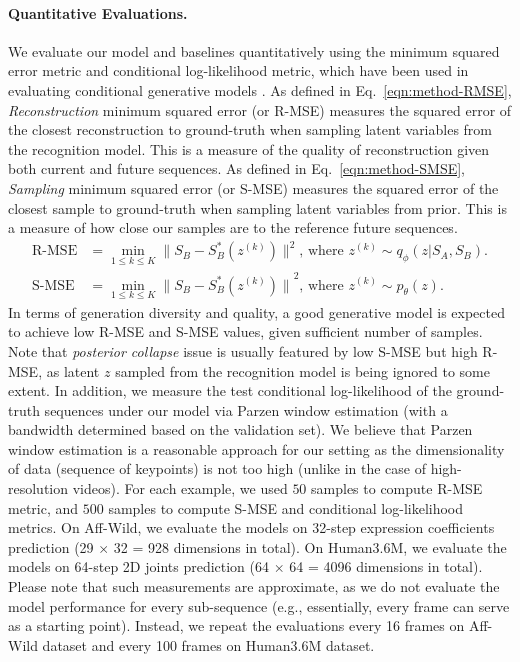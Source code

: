 \documentclass[runningheads]{llncs}
\begin{document}
\paragraph{Quantitative Evaluations.}
\vspace*{-0.1in}
We evaluate our model and baselines quantitatively using the minimum squared error metric and conditional log-likelihood metric, which have been used in evaluating conditional generative models \cite{sohn2015learning,walker2016uncertain,yan2016attribute2image,mohammad2018stochastic}.
As defined in Eq.~\ref{eqn:method-RMSE},
\textit{Reconstruction} minimum squared error (or R-MSE) measures the squared error of the closest reconstruction to ground-truth when sampling latent variables from the recognition model. This is a measure of the quality of reconstruction given both current and future sequences. 
As defined in Eq.~\ref{eqn:method-SMSE},
\textit{Sampling} minimum squared error (or S-MSE) measures the squared error of the closest sample to ground-truth when sampling latent variables from prior. 
This is a measure of how close our samples are to the reference future sequences.
\begin{align}
\text{R-MSE} &= \min_{1\leq k \leq K} \| S_B - S^*_B(z^{(k)})\|^2 \text{, where } z^{(k)} \sim q_\phi(z|S_A, S_B).\label{eqn:method-RMSE}\\
\text{S-MSE} &= \min_{1\leq k \leq K} {\|S_B - S^*_B(z^{(k)})\|}^2 \text{, where } z^{(k)} \sim p_\theta(z).\label{eqn:method-SMSE}
\end{align}
In terms of generation diversity and quality, a good generative model is expected to achieve low R-MSE and S-MSE values, given sufficient number of samples.
Note that \textit{posterior collapse} issue is usually featured by low S-MSE but high R-MSE, as latent $z$ sampled from the recognition model is being ignored to some extent.
In addition, we measure the test conditional log-likelihood of the ground-truth sequences under our model via Parzen window estimation (with a bandwidth determined based on the validation set).
We believe that Parzen window estimation is a reasonable approach for our setting as the dimensionality of data (sequence of keypoints) is not too high (unlike in the case of high-resolution videos).
For each example, we used $50$ samples to compute R-MSE metric, and $500$ samples to compute S-MSE and conditional log-likelihood metrics.
On Aff-Wild, we evaluate the models on 32-step expression coefficients prediction (29 $\times$ 32 = 928 dimensions in total).
On Human3.6M, we evaluate the models on 64-step 2D joints prediction (64 $\times$ 64 = 4096 dimensions in total).
Please note that such measurements are approximate, as we do not evaluate the model performance for every sub-sequence (e.g., essentially, every frame can serve as a starting point).
Instead, we repeat the evaluations every 16 frames on Aff-Wild dataset and every 100 frames on Human3.6M dataset.
\end{document}
